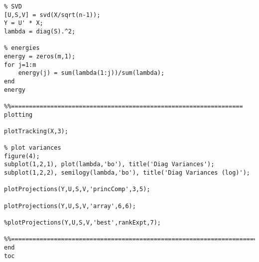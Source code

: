 \begin{verbatim}
% SVD
[U,S,V] = svd(X/sqrt(n-1));
Y = U' * X;
lambda = diag(S).^2;

% energies
energy = zeros(m,1);
for j=1:m
	energy(j) = sum(lambda(1:j))/sum(lambda);
end
energy

%%=================================================================     plotting

plotTracking(X,3);

% plot variances
figure(4);
subplot(1,2,1), plot(lambda,'bo'), title('Diag Variances');
subplot(1,2,2), semilogy(lambda,'bo'), title('Diag Variances (log)');

plotProjections(Y,U,S,V,'princComp',3,5);

plotProjections(Y,U,S,V,'array',6,6);

%plotProjections(Y,U,S,V,'best',rankExpt,7);

%%======================================================================     end
toc
\end{verbatim}